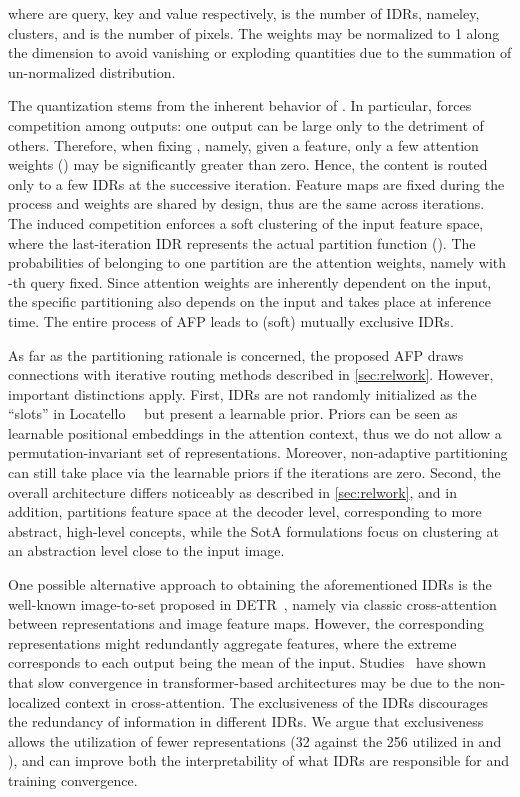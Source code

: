 where  are query, key and value respectively,  is the number of IDRs, nameley, clusters, and  is the number of pixels. The weights  may be normalized to 1 along the  dimension to avoid vanishing or exploding quantities due to the summation of un-normalized distribution. 

The quantization stems from the inherent behavior of . In particular,  forces competition among outputs: one output can be large only to the detriment of others. Therefore, when fixing , namely, given a feature, only a few attention weights () may be significantly greater than zero. Hence, the content  is routed only to a few IDRs at the successive iteration. Feature maps are fixed during the process and weights are shared by design, thus  are the same across iterations. The induced competition enforces a soft clustering of the input feature space, where the last-iteration IDR represents the actual partition function (). The probabilities of belonging to one partition are the attention weights, namely  with -th query fixed. Since attention weights are inherently dependent on the input, the specific partitioning also depends on the input and takes place at inference time. The entire process of AFP leads to (soft) mutually exclusive IDRs.

As far as the partitioning rationale is concerned, the proposed AFP draws connections with iterative routing methods described in \cref{sec:relwork}. However, important distinctions apply. First, IDRs are not randomly initialized as the ``slots'' in Locatello~\etal~\cite{Locatello2020} but present a learnable prior. Priors can be seen as learnable positional embeddings in the attention context, thus we do not allow a permutation-invariant set of representations. Moreover, non-adaptive partitioning can still take place via the learnable priors if the iterations are zero. Second, the overall architecture differs noticeably as described in \cref{sec:relwork}, and in addition, \ourmodel partitions feature space at the decoder level, corresponding to more abstract, high-level concepts, while the SotA formulations focus on clustering at an abstraction level close to the input image.


One possible alternative approach to obtaining the aforementioned IDRs is the well-known image-to-set proposed in DETR~\cite{Carion2020}, namely via classic cross-attention between representations and image feature maps. However, the corresponding representations might redundantly aggregate features, where the extreme corresponds to each output being the mean of the input. Studies~\cite{Gao2021, Sun2020} have shown that slow convergence in transformer-based architectures may be due to the non-localized context in cross-attention. The exclusiveness of the IDRs discourages the redundancy of information in different IDRs. We argue that exclusiveness allows the utilization of fewer representations (32 against the 256 utilized in \cite{Bhat2020} and \cite{Fu2018}), and can improve both the interpretability of what IDRs are responsible for and training convergence. 


